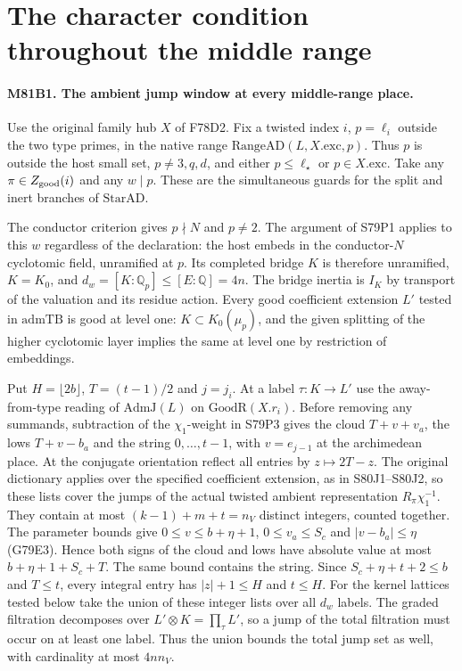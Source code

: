 \section{The character condition throughout the middle range}

\paragraph{M81B1. The ambient jump window at every middle-range place.}
Use the original family hub $X$ of F78D2. Fix a twisted index $i$,
$p=\ell_i$ outside the two type primes, in the native range
$\mathrm{RangeAD}(L,X.\mathrm{exc},p)$. Thus $p$ is outside the
host small set, $p\ne3,q,d$, and either $p\le\ell_\star$ or
$p\in X.\mathrm{exc}$. Take any $\pi\in Z_{\rm good}(i)$
and any $w\mid p$. These are the simultaneous guards for the
split and inert branches of $\mathrm{StarAD}$.

The conductor criterion gives $p\nmid N$ and $p\ne2$.
The argument of S79P1 applies to this $w$ regardless of the
declaration: the host embeds in the conductor-$N$ cyclotomic field,
unramified at $p$. Its completed bridge $K$ is therefore unramified,
$K=K_0$, and $d_w=[K:\mathbb Q_p]\le [E:\mathbb Q]=4n$.
The bridge inertia is $I_K$ by transport of the valuation and its
residue action. Every good coefficient extension $L'$ tested in
$\mathrm{admTB}$ is good at level one: $K\subset K_0(\mu_p)$,
and the given splitting of the higher cyclotomic layer implies
the same at level one by restriction of embeddings.

Put $H=\lfloor2b\rfloor$, $T=(t-1)/2$ and $j=j_i$.
At a label $\tau:K\to L'$ use the away-from-type reading of
$\mathrm{AdmJ}(L)$ on $\mathrm{GoodR}(X.r_i)$. Before removing
any summands, subtraction of the $\chi_1$-weight in S79P3 gives
the cloud $T+v+v_a$, the lows $T+v-b_a$ and the string
$0,\ldots,t-1$, with $v=e_{j-1}$ at the archimedean place.
At the conjugate orientation reflect all entries by $z\mapsto2T-z$.
The original dictionary applies over the specified coefficient
extension, as in S80J1--S80J2, so these lists cover the jumps of the actual twisted
ambient representation $R_\pi\chi_1^{-1}$. They contain at most
$(k-1)+m+t=n_V$ distinct integers, counted together.
The parameter bounds give $0\le v\le b+\eta+1$,
$0\le v_a\le S_c$ and $|v-b_a|\le\eta$ (G79E3).
Hence both signs of the cloud and lows have absolute value at most
$b+\eta+1+S_c+T$. The same bound contains the string.
Since $S_c+\eta+t+2\le b$ and $T\le t$, every integral
entry has $|z|+1\le H$ and $t\le H$. For the kernel lattices
tested below take the union of these integer lists over all
$d_w$ labels. The graded filtration decomposes over
$L'\otimes K=\prod_\tau L'$, so a jump of the total filtration
must occur on at least one label. Thus the union bounds the
total jump set as well, with cardinality at most $4nn_V$.

